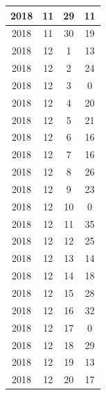 \begin{longtable} {|c|c|c|c|}
\hline
2018         & 11           & 29           & 11                        \\ 
\hline
2018         & 11           & 30           & 19                        \\ 
\hline
2018         & 12           & 1            & 13                        \\ 
\hline
2018         & 12           & 2            & 24                        \\ 
\hline
2018         & 12           & 3            & 0                         \\ 
\hline
2018         & 12           & 4            & 20                        \\ 
\hline
2018         & 12           & 5            & 21                        \\ 
\hline
2018         & 12           & 6            & 16                        \\ 
\hline
2018         & 12           & 7            & 16                        \\ 
\hline
2018         & 12           & 8            & 26                        \\ 
\hline
2018         & 12           & 9            & 23                        \\ 
\hline
2018         & 12           & 10           & 0                         \\ 
\hline
2018         & 12           & 11           & 35                        \\ 
\hline
2018         & 12           & 12           & 25                        \\ 
\hline
2018         & 12           & 13           & 14                        \\ 
\hline
2018         & 12           & 14           & 18                        \\ 
\hline
2018         & 12           & 15           & 28                        \\ 
\hline
2018         & 12           & 16           & 32                        \\ 
\hline
2018         & 12           & 17           & 0                         \\ 
\hline
2018         & 12           & 18           & 29                        \\ 
\hline
2018         & 12           & 19           & 13                        \\ 
\hline
2018         & 12           & 20           & 17                        \\ 

\end{longtable}
